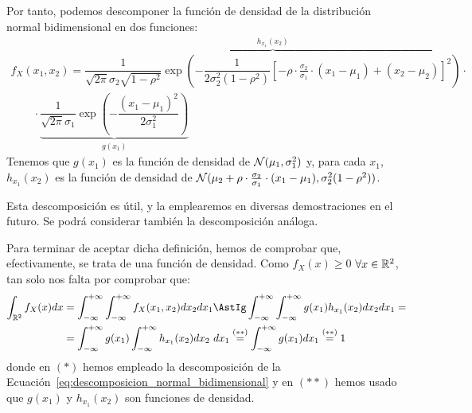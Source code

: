 Por tanto, podemos descomponer la función de densidad de la distribución normal bidimensional en dos funciones:
\begin{multline}\label{eq:descomposicion_normal_bidimensional}
    f_X(x_1,x_2)
    =\overbrace{\dfrac{1}{\sqrt{2\pi}\sigma_2\sqrt{1-\rho^2}}\exp\left(-\dfrac{1}{2\sigma_2^2(1-\rho^2)}\left[-\rho\cdot \frac{\sigma_2}{\sigma_1}\cdot (x_1-\mu_1)+ (x_2-\mu_2)\right]^2\right)}^{h_{x_1}(x_2)}
    \cdot\\\qquad \cdot \underbrace{\dfrac{1}{\sqrt{2\pi}\sigma_1}\exp\left(-\dfrac{(x_1-\mu_1)^2}{2\sigma_1^2}\right)}_{g(x_1)}
\end{multline}
Tenemos que $g(x_1)$ es la función de densidad de $\mathcal{N}(\mu_1, \sigma_1^2)$ y, para cada $x_1$, $h_{x_1}(x_2)$ es la función de densidad de $\mathcal{N}(\mu_2+\rho\cdot \frac{\sigma_2}{\sigma_1}\cdot (x_1-\mu_1), \sigma_2^2(1-\rho^2))$.\\
\begin{comment}
Repitiendo el proceso con el término $\left(\frac{x_2-\mu_2}{\sigma_2}\right)^2$, obtenemos que:
\begin{align*}
    f_X(x_1,x_2)
    &=\overbrace{\dfrac{1}{\sqrt{2\pi}\sigma_2}\exp\left(-\dfrac{(x_2-\mu_2)^2}{2\sigma_2^2}\right)}^{p(x_2)}\cdot
    \cdot\\&\qquad \cdot\underbrace{\dfrac{1}{\sqrt{2\pi}\sigma_1\sqrt{1-\rho^2}}\exp\left(-\dfrac{1}{2\sigma_1^2(1-\rho^2)}\left[-\rho\cdot \frac{\sigma_1}{\sigma_2}\cdot (x_2-\mu_2)+ (x_1-\mu_1)\right]^2\right)}_{q_{x_2}(x_1)}
\end{align*}
En este caso, $p(x_2)$ es la función de densidad de $\cc{N}(\mu_2, \sigma_2^2)$ y, para cada $x_2$, $q_{x_2}(x_1)$ es la función de densidad de $\cc{N}(\mu_1+\rho\cdot \frac{\sigma_1}{\sigma_2}\cdot (x_2-\mu_2), \sigma_1^2(1-\rho^2))$.
\end{comment}
Esta descomposición es útil, y la emplearemos en diversas demostraciones en el futuro. Se podrá considerar también la descomposición análoga.


Para terminar de aceptar dicha definición, hemos de comprobar que, efectivamente, se trata de una función de densidad.
Como $f_X(x)\geq 0$ $\forall x\in \mathbb{R}^2$, tan solo nos falta por comprobar que:
\begin{align*}
    \int_{\bb{R}^2} f_X(x)dx
    &= \int_{-\infty}^{+\infty}\int_{-\infty}^{+\infty} f_X(x_1,x_2)dx_2dx_1
    \AstIg
    \int_{-\infty}^{+\infty}\int_{-\infty}^{+\infty} g(x_1)h_{x_1}(x_2)dx_2dx_1
    =\\&=
    \int_{-\infty}^{+\infty} g(x_1) \int_{-\infty}^{+\infty} h_{x_1}(x_2)dx_2\ dx_1
    \stackrel{(\ast\ast)}{=}
    \int_{-\infty}^{+\infty} g(x_1)dx_1
    \stackrel{(\ast\ast)}{=} 1
\end{align*}
donde en $(\ast)$ hemos empleado la descomposición de la Ecuación~\ref{eq:descomposicion_normal_bidimensional} y en $(\ast\ast)$ hemos usado que $g(x_1)$ y $h_{x_1}(x_2)$ son funciones de densidad.

